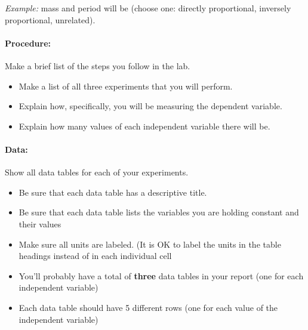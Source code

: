\documentclass[10pt]{exam}
\begin{document}
  \emph{Example:} mass and period will be (choose one: directly proportional, inversely proportional, unrelated).


\paragraph{Procedure:} 
  Make a brief list of the steps you follow in the lab.

  \begin{itemize}
    \item
      Make a list of all three experiments that you will perform.
    \item
      Explain how, specifically, you will be measuring the dependent variable.
    \item
      Explain how many values of each independent variable there will be.

  \end{itemize}

\pagebreak

\paragraph{Data:}
  Show all data tables for each of your experiments.

  \begin{itemize}
    \item
      Be sure that each data table has a descriptive title.
    \item
      Be sure that each data table lists the variables you are holding constant and their values
    \item
      Make sure all units are labeled. (It is OK to label the units in the table headings instead of in each individual cell
    \item
      You'll probably have a total of \textbf{three} data tables in your report (one for each independent variable)
    \item
      Each data table should have 5 different rows (one for each value of the independent variable)
  \end{itemize}
\end{document}
